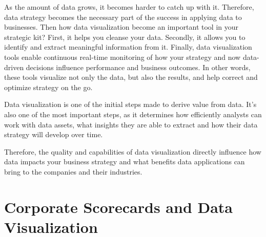 \documentclass[]{book}
\theoremstyle{definition}
\theoremstyle{definition}
\theoremstyle{definition}
\theoremstyle{remark}
\begin{document}
As the amount of data grows, it becomes harder to catch up with it.
Therefore, data strategy becomes the necessary part of the success in
applying data to businesses. Then how data visualization become an
important tool in your strategic kit? First, it helps you cleanse your
data. Secondly, it allows you to identify and extract meaningful
information from it. Finally, data visualization tools enable continuous
real-time monitoring of how your strategy and now data-driven decisions
influence performance and business outcomes. In other words, these tools
visualize not only the data, but also the results, and help correct and
optimize strategy on the go.

Data visualization is one of the initial steps made to derive value from
data. It's also one of the most important steps, as it determines how
efficiently analysts can work with data assets, what insights they are
able to extract and how their data strategy will develop over time.

Therefore, the quality and capabilities of data visualization directly
influence how data impacts your business strategy and what benefits data
applications can bring to the companies and their industries.

\section{Corporate Scorecards and Data
Visualization}\label{corporate-scorecards-and-data-visualization}
\end{document}
